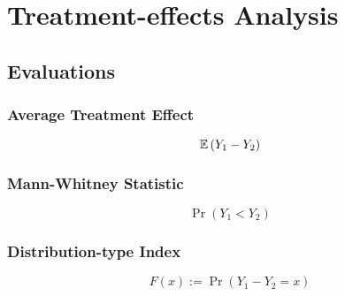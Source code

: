 \chapter{Treatment-effects Analysis}

\section{Evaluations}

\subsection{Average Treatment Effect}

\begin{definition}
	\begin{equation}
		{\mathbb E}\left(Y_{1}-Y_{2}\right)
	\end{equation}
\end{definition}

\subsection{Mann-Whitney Statistic}

\begin{definition}
	\begin{equation}
		\operatorname{Pr}\left(Y_{1}<Y_{2}\right)
	\end{equation}
\end{definition}

\subsection{Distribution-type Index}

\begin{definition}
	\begin{equation}
		F(x):=\operatorname{Pr}\left(Y_{1}-Y_{2}=x\right)
	\end{equation}
\end{definition}
